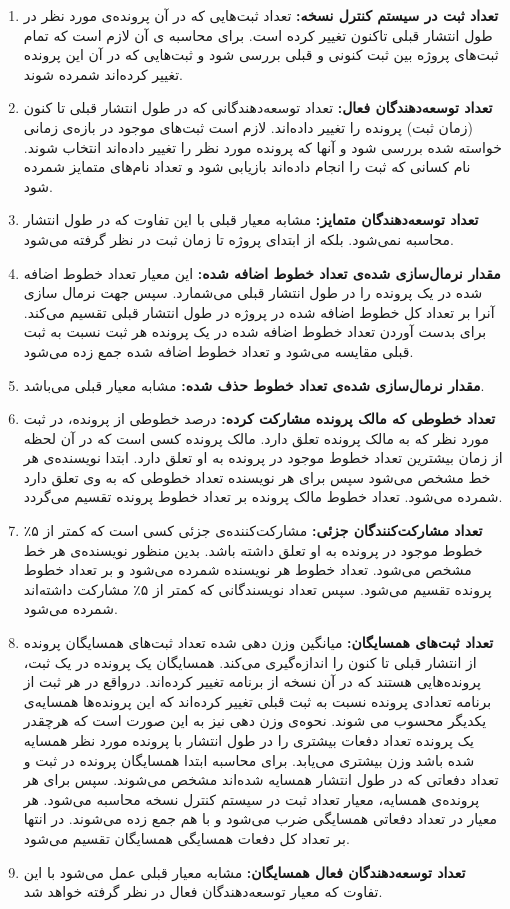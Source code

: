 \begin{enumerate}
\item
\textbf{تعداد ثبت در سیستم کنترل نسخه:}
 تعداد ثبت‌هایی که در آن پرونده‌ی ‌مورد نظر در طول انتشار قبلی تاکنون تغییر کرده است. برای محاسبه ی آن لازم است که تمام ثبت‌های پروژه بین ثبت کنونی و  قبلی بررسی شود و ثبت‌هایی که در آن این پرونده تغییر کرده‌اند شمرده شوند.
 \item
\textbf{تعداد توسعه‌دهندگان 
	فعال:}
 تعداد توسعه‌دهندگانی که در طول انتشار قبلی تا کنون (زمان ثبت) پرونده را تغییر داده‌اند. لازم است ثبت‌های موجود در باز‌ه‌ی زمانی خواسته شده بررسی شود و آنها که پرونده مورد نظر را تغییر داده‌اند انتخاب شوند. نام کسانی که ثبت را انجام داده‌اند بازیابی شود و تعداد نام‌های متمایز شمرده شود. 
 \item
 \textbf{تعداد توسعه‌دهندگان	متمایز:}
 مشابه معیار قبلی با این تفاوت که در طول انتشار محاسبه نمی‌شود. بلکه از ابتدای پروژه تا زمان ثبت در نظر گرفته می‌شود. 
\item
\textbf{مقدار نرمال‌سازی شده‌ی تعداد خطوط اضافه شده:}
این معیار تعداد خطوط اضافه شده در یک پرونده را در طول انتشار قبلی می‌شمارد. سپس جهت نرمال سازی آنرا بر تعداد کل خطوط اضافه شده در پروژه در طول انتشار قبلی تقسیم می‌کند. برای بدست آوردن تعداد خطوط اضافه شده در یک پرونده هر ثبت نسبت به ثبت قبلی مقایسه می‌شود و تعداد خطوط اضافه شده جمع زده می‌شود.
\item
\textbf{مقدار نرمال‌سازی شده‌ی تعداد خطوط حذف شده:}
مشابه معیار قبلی می‌باشد. 
\item
\textbf{تعداد خطوطی که مالک پرونده مشارکت کرده:}
 درصد خطوطی  از پرونده، در  ثبت مورد نظر  که به مالک پرونده تعلق دارد. مالک پرونده کسی است که در آن لحظه از زمان بیشترین تعداد خطوط موجود در پرونده به او تعلق دارد. ابتدا نویسنده‌ی هر خط مشخص می‌شود سپس برای هر نویسنده تعداد خطوطی که به وی تعلق دارد شمرده می‌شود. تعداد خطوط مالک پرونده بر تعداد خطوط پرونده تقسیم می‌گردد.
\item
\textbf{تعداد مشارکت‌کنندگان جزئی:}
مشارکت‌کننده‌ی جزئی کسی است که کمتر از ۵٪ خطوط موجود در پرونده به او تعلق داشته باشد. بدین منظور نویسنده‌ی هر خط مشخص می‌شود. تعداد خطوط هر نویسنده شمرده می‌شود و بر تعداد خطوط پرونده تقسیم می‌شود. سپس تعداد نویسندگانی که کمتر از ۵٪ مشارکت داشته‌اند شمرده می‌شود. 
\item
\textbf{تعداد ثبت‌های همسایگان:}
 میانگین وزن دهی شده تعداد ثبت‌های همسایگان پرونده از انتشار قبلی تا کنون را اندازه‌گیری می‌کند. همسایگان یک پرونده در یک ثبت، پرونده‌هایی هستند که در آن نسخه از برنامه تغییر کرده‌اند. در‌واقع در هر ثبت از برنامه تعدادی پرونده نسبت به ثبت قبلی تغییر کرده‌اند که این پرونده‌ها همسایه‌ی یکدیگر محسوب می شوند. نحوه‌ی وزن دهی نیز به این صورت است که هرچقدر یک پرونده تعداد دفعات بیشتری را در طول انتشار با پرونده مورد نظر همسایه شده باشد وزن بیشتری می‌یابد. برای محاسبه ابتدا همسایگان پرونده در ثبت  و تعداد دفعاتی که  در طول انتشار همسایه شده‌اند مشخص می‌شوند. سپس برای هر پرونده‌ی همسایه، معیار تعداد ثبت در سیستم کنترل نسخه محاسبه می‌شود. هر معیار در تعداد دفعاتی همسایگی ضرب می‌شود و با هم جمع زده می‌شوند. در انتها بر تعداد کل دفعات همسایگی همسایگان تقسیم می‌شود. 
\item
\textbf{تعداد توسعه‌دهندگان فعال همسایگان:}
مشابه معیار قبلی عمل می‌شود با این تفاوت که معیار توسعه‌دهندگان فعال در نظر گرفته خواهد شد.


\end{enumerate}
